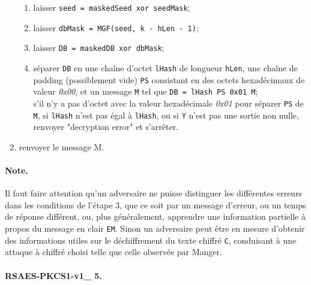 \begin{enumerate}
\begin{enumerate}
       \item laisser \texttt{seed = maskedSeed xor seedMask};
       \item laisser \texttt{dbMask = MGF(seed, k - hLen - 1)};
       \item laisser \texttt{DB = maskedDB xor dbMask};
       \item séparer \texttt{DB} en une chaîne d'octet \texttt{lHash} de longueur \texttt{hLen}, une chaîne de padding (possiblement vide) \texttt{PS} consistant en des octets hexadécimaux de valeur \textit{0x00}, et un message \texttt{M} tel que \texttt{DB = lHash \textbar\textbar PS \textbar\textbar 0x01 \textbar\textbar M};
\\ s'il n'y a pas d'octet avec la valeur hexadécimale \textit{0x01} pour séparer \texttt{PS} de \texttt{M}, si \texttt{lHash} n'est pas égal à \texttt{lHash}, ou si \texttt{Y} n'est pas une sortie non nulle, renvoyer "decryption error" et s'arrêter.\\
\end{enumerate}
\item renvoyer le message M.\\
\end{enumerate}
\paragraph{Note. \\} 
Il faut faire attention qu'un adversaire ne puisse distinguer les différentes erreurs dans les conditions de l'étape 3, que ce soit par un message d'erreur, ou un temps de réponse différent, ou, plus généralement, apprendre une information partielle à propos du message en clair \texttt{EM}. Sinon un adversaire peut être en mesure d'obtenir des informations utiles sur le déchiffrement du texte chiffré \texttt{C}, conduisant à une attaque à chiffré choisi telle que celle observée par Manger.
   
\paragraph{RSAES-PKCS1-v1\_ 5. \\}

